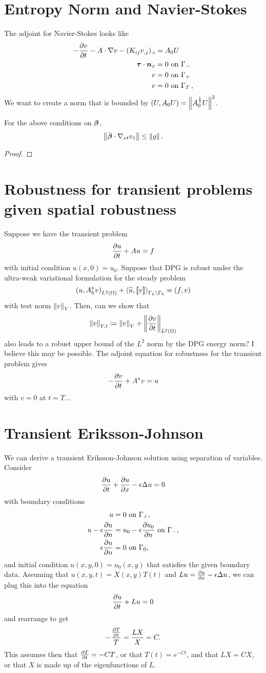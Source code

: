 \documentclass{article}
\begin{document}
\section{Entropy Norm and Navier-Stokes}
The adjoint for Navier-Stokes looks like
\begin{align*}
-\frac{\partial v}{\partial t}-A\cdot\nabla v - (K_{ij}v_{,j})_{,i} &= A_0 U\\
\boldsymbol\tau\cdot\boldsymbol n_x &= 0 \text{ on } \Gamma_-\\
v &= 0 \text{ on } \Gamma_+\\
v &= 0 \text{ on } \Gamma_T\,,
\end{align*}
We want to create a norm that is bounded by $(U,A_0U)=\left\| A_0^\frac{1}{2}U \right\|^2$.
\begin{lemma}
\label{lem:convectiveNS}
For the above conditions on $\boldsymbol\beta$,
\[
\left\| \tilde{\boldsymbol\beta}\cdot\nabla_{xt} v_1 \right\|\leq \left\| g \right\|.
\]
\end{lemma}
\begin{proof}
\end{proof}

\section{Robustness for transient problems given spatial robustness}

Suppose we have the transient problem
\[
\frac{\partial u}{\partial t} + Au = f
\]
with initial condition $u(x,0) = u_0$.  Suppose that DPG is robust under the ultra-weak variational formulation for the steady problem
\[
\left( u,A^*_h v \right)_{L^2\left( \Omega \right)} + \left\langle \widehat{u}, \left[ \![v]\! \right] \right\rangle_{\Gamma_h\setminus \Gamma_0} = \left( f,v \right)
\]
with test norm $\left\| v \right\|_{V}$.  Then, can we show that 
\[
\left\| v \right\|_{V,t} \coloneqq \left\| v \right\|_V + \left\| \frac{\partial v}{\partial t} \right\|_{L^2\left( \Omega \right)}
\]
also leads to a robust upper bound of the $L^2$ norm by the DPG energy norm?  I believe this may be possible.  The adjoint equation for robustness for the transient problem gives
\[
-\frac{\partial v}{\partial t} + A^*v = u
\]
with $v = 0$ at $t=T$...  

\section{Transient Eriksson-Johnson}

We can derive a transient Eriksson-Johnson solution using separation of variables.  Consider
\[
\frac{\partial u}{\partial t} + \frac{\partial u}{\partial x} - \epsilon \Delta u = 0
\]
with boundary conditions
\begin{align*}
u &= 0 \text{ on } \Gamma_+,\\
u - \epsilon\frac{\partial u}{\partial n} &= u_0 - \epsilon\frac{\partial u_0}{\partial n} \text{ on }\Gamma_-,\\
\epsilon\frac{\partial u}{\partial n} &= 0 \text{ on } \Gamma_0,
\end{align*}
and initial condition $u(x,y,0) = u_0(x,y)$ that satisfies the given boundary data.  Assuming that $u(x,y,t) = X(x,y)T(t)$ and $Lu = \frac{\partial u}{\partial x} - \epsilon \Delta u$, we can plug this into the equation 
\[
\frac{\partial u}{\partial t} + Lu = 0
\]
and rearrange to get 
\[
-\frac{\frac{\partial T}{\partial t}}{T} = \frac{LX}{X} = C.
\]
This assumes then that $\frac{\partial T}{\partial t} = -CT$, or that $T(t) = e^{-Ct}$, and that $LX = CX$, or that $X$ is made up of the eigenfunctions of $L$.  
\end{document}
